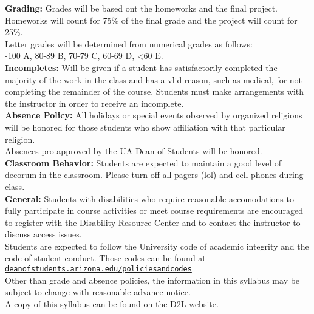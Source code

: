 \documentclass{article}
\begin{document}
\newpage
\textbf{Grading:} Grades will be based ont the homeworks and the 
final project. Homeworks will count for 75\% of the final grade
and the project will count for 25\%.\\
Letter grades will be determined from numerical grades as follows:\\
-100 A, 80-89 B, 70-79 C, 60-69 D, <60 E.\\

\textbf{Incompletes:} Will be given if a student has 
\underline{satisfactorily} completed the majority of the work in the class 
and has a vlid reason, such as  medical, for not completing the 
remainder of the course. Students must make arrangements with the 
instructor in order to receive an incomplete.\\

\textbf{Absence Policy:} All holidays or special events observed 
by organized religions will be honored for those students who show
affiliation with that particular religion.\\
Absences pro-approved by the UA Dean of Students will be honored.\\

\textbf{Classroom Behavior:} Students are expected to maintain a good 
level of decorum in the classroom. Please turn off all pagers (lol)
and cell phones during class.\\

\textbf{General:} Students with disabilities who require reasonable 
accomodations to fully participate in course activities or meet
course requirements are encouraged to register with the Disability
Resource Center and to contact the instructor to discuss access issues.\\

Students are expected to follow the University code of academic integrity
and the code of student conduct. Those codes can be found at\\
\href{http://deanofstudents.arizona.edu/policiesandcodes}{\nolinkurl{deanofstudents.arizona.edu/policiesandcodes}}\\

Other than grade and absence policies, the information in this syllabus
may be subject to change with reasonable advance notice.\\
   
A copy of this syllabus can be found on the D2L website.
\end{document}
